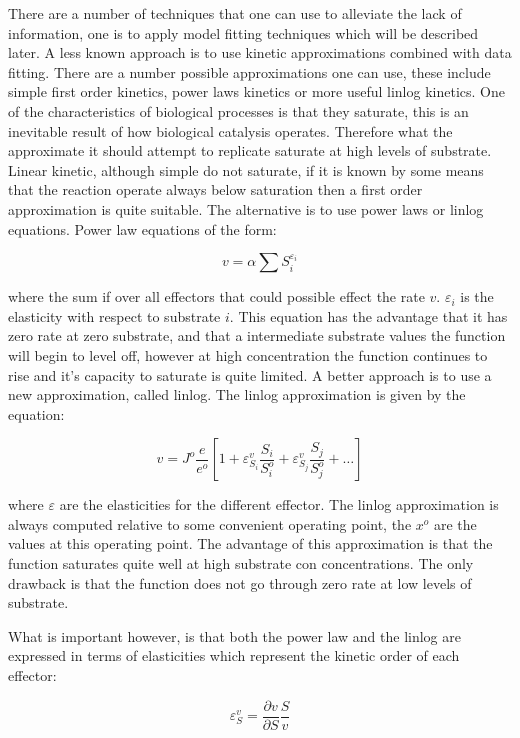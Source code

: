 There are a number of techniques that one can use to alleviate the
lack of information, one is to apply model fitting techniques
which will be described later. A less known approach is to use
kinetic approximations combined with data fitting. There are a
number possible approximations one can use, these include simple
first order kinetics, power laws kinetics or more useful linlog
kinetics. One of the characteristics of biological processes is
that they saturate, this is an inevitable result of how biological
catalysis operates. Therefore what the approximate it should
attempt to replicate saturate at high levels of substrate. Linear
kinetic, although simple do not saturate, if it is known by some
means that the reaction operate always below saturation then a
first order approximation is quite suitable. The alternative is to use
power laws or linlog equations. Power law equations of the form:

$$ v = \alpha \sum S_i^{\varepsilon_i} $$

where the sum if over all effectors that could possible effect the
rate $v$. $\varepsilon_i$ is the elasticity with respect to
substrate $i$. This equation has the advantage that it has zero
rate at zero substrate, and that a intermediate substrate values
the function will begin to level off, however at high
concentration the function continues to rise and it's capacity to
saturate is quite limited. A better approach is to use a new
approximation, called linlog. The linlog approximation is given by
the equation:

\begin{equation} \label{eqn:linlog}
v = J^o \frac{e}{e^o} \left[ 1 + \varepsilon_{S_i}^{v} \frac{S_i}{S^o_i} +
  \varepsilon_{S_j}^v \frac{S_j}{S^o_j} + \ldots \right]
\end{equation}

where $\varepsilon$ are the elasticities for the different
effector. The linlog approximation is always computed relative to
some convenient operating point, the $x^o$ are the values at this
operating point. The advantage of this approximation is that the
function saturates quite well at high substrate con
concentrations. The only drawback is that the function does not go
through zero rate at low levels of substrate.

What is important however, is that both the power law and the
linlog are expressed in terms of elasticities which represent the
kinetic order of each effector:

$$ \varepsilon^v_S = \frac{\partial v}{\partial S} \frac{S}{v} $$

